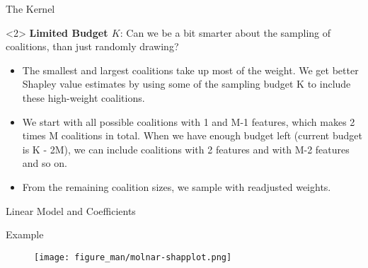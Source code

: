 \documentclass[10pt,compress,t,notes=noshow, xcolor=table]{beamer}
\begin{document}
\begin{vbframe}{The Kernel}
\begin{onlyenv}<2>
\textbf{Limited Budget $K$}: Can we be a bit smarter about the sampling of coalitions, than just randomly drawing?
\begin{itemize}
    \item The smallest and largest coalitions take up most of the weight. We get better Shapley value estimates by using some of the sampling budget K to include these high-weight coalitions.
    \item We start with all possible coalitions with 1 and M-1 features, which makes 2 times M coalitions in total. When we have enough budget left (current budget is K - 2M), we can include coalitions with 2 features and with M-2 features and so on.
    \item From the remaining coalition sizes, we sample with readjusted weights.
\end{itemize}
\end{onlyenv}
  

 \end{vbframe}
 
 \begin{vbframe}{Linear Model and Coefficients}

 \end{vbframe}
 
\begin{vbframe}{Example}

\begin{figure}
    \centering
    \texttt{[image: figure\_man/molnar-shapplot.png]}
\end{figure}

\end{vbframe}
\end{document}
